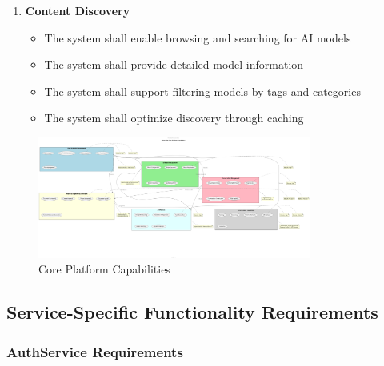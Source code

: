 \begin{enumerate}
   \item \textbf{Content Discovery}
   \begin{itemize}
      \item The system shall enable browsing and searching for AI models
      \item The system shall provide detailed model information
      \item The system shall support filtering models by tags and categories
      \item The system shall optimize discovery through caching
   \end{itemize}
\end{enumerate}

\begin{figure}
    \centering
    \includegraphics[width=0.8\textwidth]{./Chapter03/figures/Core_Platform_Capabilities.png}
    \caption{Core Platform Capabilities}
    \label{fig:platform-capabilities}
\end{figure}

\subsection{Service-Specific Functionality Requirements}

\subsubsection*{AuthService Requirements}

